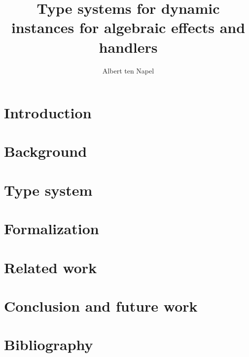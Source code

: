 \documentclass[12pt]{article}
\title{Type systems for dynamic instances for algebraic effects and handlers}
\author{Albert ten Napel}
\date{}
\begin{document}
\maketitle

\section{Introduction}


\section{Background}



\section{Type system}


\section{Formalization}


\section{Related work}


\section{Conclusion and future work}

\section*{Bibliography}
\end{document}
